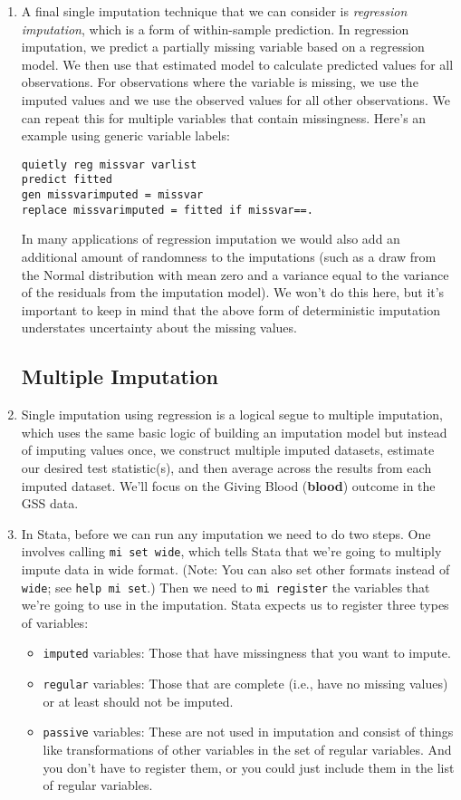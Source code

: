 \documentclass[a4paper,12pt]{article}
\begin{document}
\begin{enumerate}
\item A final single imputation technique that we can consider is {\em regression imputation}, which is a form of within-sample prediction. In regression imputation, we predict a partially missing variable based on a regression model. We then use that estimated model to calculate predicted values for all observations. For observations where the variable is missing, we use the imputed values and we use the observed values for all other observations. We can repeat this for multiple variables that contain missingness. Here's an example using generic variable labels:
\begin{verbatim}
quietly reg missvar varlist
predict fitted
gen missvarimputed = missvar
replace missvarimputed = fitted if missvar==.
\end{verbatim}

In many applications of regression imputation we would also add an additional amount of randomness to the imputations (such as a draw from the Normal distribution with mean zero and a variance equal to the variance of the residuals from the imputation model). We won't do this here, but it's important to keep in mind that the above form of deterministic imputation understates uncertainty about the missing values.

\subsection*{Multiple Imputation}

\item Single imputation using regression is a logical segue to multiple imputation, which uses the same basic logic of building an imputation model but instead of imputing values once, we construct multiple imputed datasets, estimate our desired test statistic(s), and then average across the results from each imputed dataset. We'll focus on the Giving Blood (\textbf{blood}) outcome in the GSS data. 

\item In Stata, before we can run any imputation we need to do two steps. One involves calling \texttt{mi set wide}, which tells Stata that we're going to multiply impute data in wide format. (Note: You can also set other formats instead of \texttt{wide}; see \texttt{help mi set}.) Then we need to \texttt{mi register} the variables that we're going to use in the imputation. Stata expects us to register three types of variables:
	\begin{itemize}
	\item \texttt{imputed} variables: Those that have missingness that you want to impute.
	\item \texttt{regular} variables: Those that are complete (i.e., have no missing values) or at least should not be imputed.
	\item \texttt{passive} variables: These are not used in imputation and consist of things like transformations of other variables in the set of regular variables. And you don't have to register them, or you could just include them in the list of regular variables.
	\end{itemize}


\end{enumerate}
\end{document}
